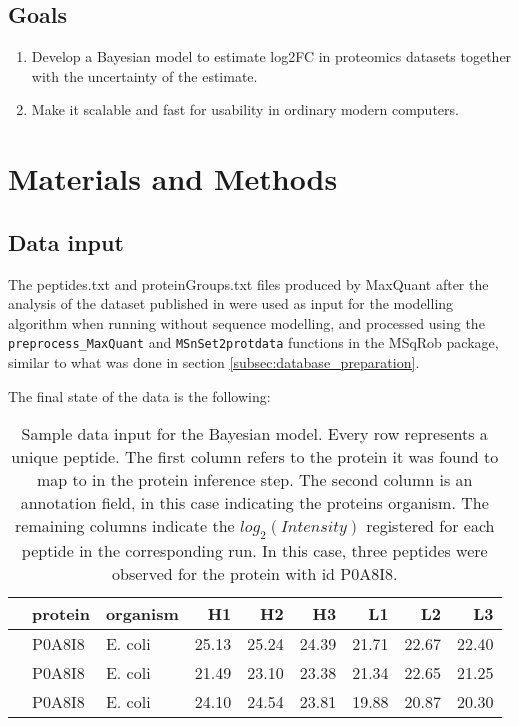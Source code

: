 \subsection{Goals}

\begin{enumerate}

\item Develop a Bayesian model to estimate log2FC in proteomics datasets together with the uncertainty of the estimate.

\item Make it scalable and fast for usability in ordinary modern computers.

\end{enumerate}

\section{Materials and Methods}

\subsection{Data input}
The peptides.txt and proteinGroups.txt files produced by MaxQuant \cite{Cox2008} after the analysis of the dataset published in \cite{Cox2014} were used as input for the modelling algorithm when running without sequence modelling, and processed using the \texttt{preprocess\_MaxQuant} and \texttt{MSnSet2protdata} functions in the MSqRob \cite{Goeminne2016} package, similar to what was done in section \ref{subsec:database_preparation}.

The final state of the data is the following:

\begin{table}
\begin{tabular}{lllrrrrrr}
\toprule
{} & protein &    organism &     H1 &     H2 &     H3 &     L1 &     L2 &     L3 \\
\midrule
     &  P0A8I8 &  E. coli &  25.13 &  25.24 &  24.39 &  21.71 &  22.67 &  22.40 \\
     &  P0A8I8 &  E. coli &  21.49 &  23.10 &  23.38 &  21.34 &  22.65 &  21.25 \\
     &  P0A8I8 &  E. coli &  24.10 &  24.54 &  23.81 &  19.88 &  20.87 &  20.30 \\
\bottomrule
\end{tabular}
\caption{Sample data input for the Bayesian model. Every row represents a unique peptide. The first column refers to the protein it was found to map to in the protein inference step. The second column is an annotation field, in this case indicating the protein\textquotesingle s organism. The remaining columns indicate the $log_2(Intensity)$ registered for each peptide in the corresponding run. In this case, three peptides were observed for the protein with id P0A8I8.}
\end{table}

